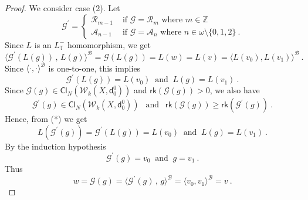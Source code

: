 \documentclass[10pt,a4paper]{amsart}
\begin{document}
\begin{proof}
 
 
 
 
 We consider case (2). 
 Let  
 \[
  \mathcal{G}^{  \prime  }    =   \begin{cases}
  \mathcal{R}_{ m-1}     &   \mbox{  if  }      \mathcal{G} =  \mathcal{R}_m    \mbox{  where  }   m  \in  \mathbb{Z}
  \\
    \mathcal{A}_{ n-1}     &   \mbox{  if  }      \mathcal{G} =  \mathcal{A}_n    \mbox{  where  }   n  \in  \omega  \setminus  \lbrace 0, 1,  2  \rbrace
\         .
  \end{cases}
 \]
 Since  $  L $  is an $  L_{  \mathbb{T} }^-  $  homomorphism,  we get  
\[
\langle    \mathcal{G}^{  \prime  }      \left(  L(g)  \right)    \,    ,    \,   L(g)   \rangle^{  \mathcal{B}  }  
= 
 \mathcal{G} \left(  L(g)  \right) 
 =   L(w)   =  L(v)   =  
  \langle  L(v_0) ,  L( v_1)  \rangle^{  \mathcal{B}  }  
\     .
\]
Since  $  \langle  \cdot  ,  \cdot   \rangle^{  \mathcal{B}  }   $  is one-to-one,  
this implies
\[
 \mathcal{G}^{  \prime  }      \left(  L(g)  \right)    =      L(v_0)   
 \     \mbox{  and   }       \    
    L(g)          =    L( v_1 )  
    \         .       \tag{*}
\]
Since    $  \mathcal{G}      \left(  g  \right)     \in     \mathsf{Cl}_{N}  \left(  \mathcal{W}_{k}  \left( X  ,  \mathsf{d}^0_0  \right)   \right)   $  
and $  \mathsf{rk}  \left(    \mathcal{G}      \left(  g   \right)   \right)   >  0  $, 
we also have  
 \[
   \mathcal{G}^{  \prime }      \left(   g \right)     \in     \mathsf{Cl}_{N}  \left(  \mathcal{W}_{k}  \left( X   ,  \mathsf{d}^0_0 \right)   \right)   
   \    \     \mbox{  and  }      \        \   
   \mathsf{rk}  \left(    \mathcal{G}      \left(  g \right)   \right)     \geq   
\mathsf{rk}  \left(    \mathcal{G}^{  \prime }       \left(  g  \right)   \right)   
\        .
\]
Hence,  from (*)   we get  
\[
  L   \left(    \mathcal{G}^{  \prime  }      \left(  g   \right)   \right)  
  =     \mathcal{G}^{  \prime  }      \left(  L(g)  \right)    =      L(v_0)   
 \     \mbox{  and   }       \    
    L(g)          =    L( v_1 )  
    \         .       
\]
By the induction hypothesis 
\[
  \mathcal{G}^{  \prime  }      \left(  g   \right)    =  v_0 
 \     \mbox{  and   }       \    
   g        =   v_1 
    \         .       
\]
Thus 
\[
w  =     \mathcal{G}     \left(  g   \right)  
= 
\langle    \mathcal{G}^{  \prime  }      \left( g   \right)    \,    ,    \,  g   \rangle^{  \mathcal{B}  }  
= 
\langle   v_0,  v_1   \rangle^{  \mathcal{B}  }  
=  v  
\          .
\]
 
 
 

\end{proof}
\end{document}
